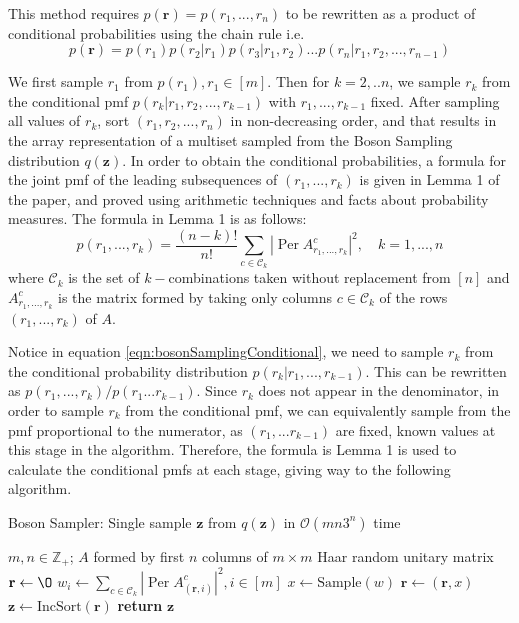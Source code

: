 \documentclass[11pt]{article}
\theoremstyle{theorem}
\theoremstyle{remark}
\theoremstyle{plain}
\theoremstyle{definition}
\DeclareMathOperator*{\Per}{\mathrm{Per}}
\begin{document}
This method requires $p(\mathbf{r}) = p(r_1, ... , r_n)$ to be rewritten as a product of conditional probabilities using the chain rule i.e.
\begin{equation}\label{eqn:bosonSamplingConditional}
p(\mathbf{r}) = p(r_1)p(r_2 | r_1) p (r_3 | r_1, r_2) ... p(r_n | r_1, r_2, ... , r_{n-1})
\end{equation}

We first sample $r_1$ from $p(r_1), r_1 \in [m]$. Then for $k=2, .. n$, we sample $r_k$ from the conditional pmf $p(r_k | r_1, r_2, ... , r_{k-1})$ with $r_1, ... , r_{k-1}$ fixed. After sampling all values of $r_k$, sort $(r_1, r_2, ... , r_n)$ in non-decreasing order, and that results in the array representation of a multiset sampled from the Boson Sampling distribution $q(\mathbf{z})$. In order to obtain the conditional probabilities, a formula for the joint pmf of the leading subsequences of $(r_1, ... , r_k)$ is given in Lemma 1 of the paper, and proved using arithmetic techniques and facts about probability measures. The formula in Lemma 1 is as follows:
\begin{equation}
p(r_1, ... , r_k) = \frac{(n-k)!}{n!} \sum_{c \in \mathcal{C}_k} \left| \Per A_{r_1, ... , r_k}^c \right| ^2 , \quad k = 1, ... , n
\end{equation}
where $\mathcal{C}_k$ is the set of $k-$combinations taken without replacement from $[n]$ and $A_{r_1, ... , r_k}^c$ is the matrix formed by taking only columns $c \in \mathcal{C}_k$ of the rows $(r_1, ... , r_k)$ of $A$.

Notice in equation \ref{eqn:bosonSamplingConditional}, we need to sample $r_k$ from the conditional probability distribution $p(r_k | r_1, ... , r_{k-1})$. This can be rewritten as $p(r_1, ... , r_k)/p(r_1 ... r_{k-1})$. Since $r_k$ does not appear in the denominator, in order to sample $r_k$ from the conditional pmf, we can equivalently sample from the pmf proportional to the numerator, as $(r_1, ... r_{k-1})$ are fixed, known values at this stage in the algorithm. Therefore, the formula is Lemma 1 is used to calculate the conditional pmfs at each stage, giving way to the following algorithm.

\begin{algorithm}
\caption{Boson Sampler: Single sample $\mathbf{z}$ from $q(\mathbf{z})$ in $\mathcal{O}(mn3^n)$ time}
\begin{algorithmic}[1]
\Require $m, n \in \mathbb{Z}_+$; $A$ formed by first $n$ columns of $m \times m$ Haar random unitary matrix
\State $\mathbf{r} \leftarrow \O $
\State $w_i \leftarrow \sum_{c \in \mathcal{C}_k} \left| \Per A_{(\mathbf{r}, i)}^c \right| ^2, i \in [m] $
\State $x \leftarrow \text{Sample}(w)$
\State $\mathbf{r} \leftarrow (\mathbf{r}, x)$
\EndFor
\State $\mathbf{z} \leftarrow \text{IncSort}(\mathbf{r})$
\State \textbf{return} $\mathbf{z}$
\end{algorithmic}
\end{algorithm}
\end{document}
